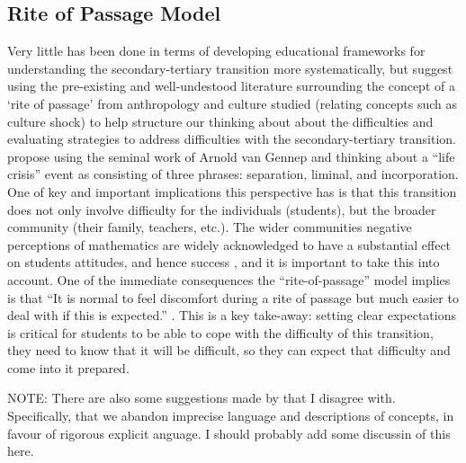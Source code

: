 \documentclass[twoside,12pt,a4paper]{report}
\begin{document}
\subsection*{Rite of Passage Model}

Very little has been done in terms of developing educational frameworks for understanding the secondary-tertiary transition more systematically, but  suggest using the pre-existing and well-undestood literature surrounding the concept of a `rite of passage' from anthropology and culture studied (relating concepts such as culture shock) to help structure our thinking about about the difficulties and evaluating strategies to address difficulties with the secondary-tertiary transition.  propose using the seminal work of Arnold van Gennep and thinking about a ``life crisis'' event as consisting of three phrases: separation, liminal, and incorporation. One of key and important implications this perspective has is that this transition does not only involve difficulty for the individuals (students), but the broader community (their family, teachers, etc.). The wider communities negative perceptions of mathematics are widely acknowledged to have a substantial effect on students attitudes, and hence success \cite{King2015, Gordon2013}, and it is important to take this into account. One of the immediate consequences the ``rite-of-passage'' model implies is that ``It is normal to feel
discomfort during a rite of passage but much easier to deal with if this is expected.'' \cite{Clark2008}. This is a key take-away: setting clear expectations is critical for students to be able to cope with the difficulty of this transition, they need to know that it will be difficult, so they can expect that difficulty and come into it prepared. 

NOTE: There are also some suggestions made by  that I disagree with. Specifically, that we abandon imprecise language and descriptions of concepts, in favour of rigorous explicit anguage. I should probably add some discussin of this here.
\end{document}
